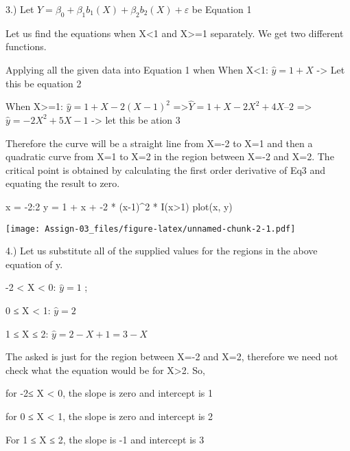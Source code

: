 \documentclass[
]{article}
\newenvironment{Shaded}{\begin{snugshade}}{\end{snugshade}}
\newcommand{\DecValTok}[1]{\textcolor[rgb]{0.00,0.00,0.81}{#1}}
\newcommand{\FunctionTok}[1]{\textcolor[rgb]{0.00,0.00,0.00}{#1}}
\newcommand{\NormalTok}[1]{#1}
\newcommand{\OtherTok}[1]{\textcolor[rgb]{0.56,0.35,0.01}{#1}}
\newcommand{\SpecialCharTok}[1]{\textcolor[rgb]{0.00,0.00,0.00}{#1}}
\begin{document}
3.) Let \(Y =β_0 +β_1b_1(X)+β_2b_2(X)+ε\) be Equation 1

Let us find the equations when X\textless1 and X\textgreater=1
separately. We get two different functions.

Applying all the given data into Equation 1 when When X\textless1:
\(\hat{y} = 1+X\) -\textgreater{} Let this be equation 2

When X\textgreater=1: \(\hat{y}= 1 + X - 2(X-1)^2\)
=\textgreater{}\(\hat{Y} = 1+ X- 2X^2 + 4X – 2\)
=\textgreater{}\(\hat{y} = -2X^2+5X-1\) -\textgreater{} let this be
ation 3

Therefore the curve will be a straight line from X=-2 to X=1 and then a
quadratic curve from X=1 to X=2 in the region between X=-2 and X=2. The
critical point is obtained by calculating the first order derivative of
Eq3 and equating the result to zero.

\begin{Shaded}
\begin{Highlighting}[]
\NormalTok{x }\OtherTok{=} \SpecialCharTok{{-}}\DecValTok{2}\SpecialCharTok{:}\DecValTok{2}
\NormalTok{y }\OtherTok{=} \DecValTok{1} \SpecialCharTok{+}\NormalTok{ x }\SpecialCharTok{+} \SpecialCharTok{{-}}\DecValTok{2} \SpecialCharTok{*}\NormalTok{ (x}\DecValTok{{-}1}\NormalTok{)}\SpecialCharTok{\^{}}\DecValTok{2} \SpecialCharTok{*} \FunctionTok{I}\NormalTok{(x}\SpecialCharTok{\textgreater{}}\DecValTok{1}\NormalTok{)}
\FunctionTok{plot}\NormalTok{(x, y)}
\end{Highlighting}
\end{Shaded}

\texttt{[image: Assign-03\_files/figure-latex/unnamed-chunk-2-1.pdf]}

4.) Let us substitute all of the supplied values for the regions in the
above equation of y.

-2 \textless{} X \textless{} 0: \(\hat{y}= 1\) ;

0 ≤ X \textless{} 1: \(\hat{y} = 2\)

1 ≤ X ≤ 2: \(\hat{y} = 2-X+1 = 3-X\)

The asked is just for the region between X=-2 and X=2, therefore we need
not check what the equation would be for X\textgreater2. So,

for -2≤ X \textless{} 0, the slope is zero and intercept is 1

for 0 ≤ X \textless{} 1, the slope is zero and intercept is 2

For 1 ≤ X ≤ 2, the slope is -1 and intercept is 3
\end{document}
